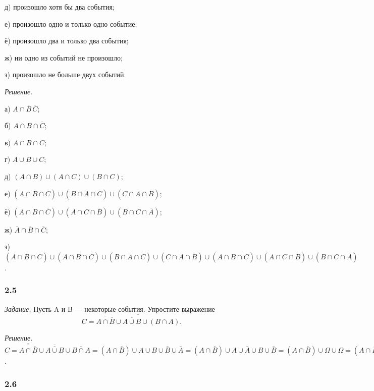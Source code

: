 \documentclass{book}
\begin{document}
д) произошло хотя бы два события;

е) произошло одно и только одно событие;

ё) произошло два и только два события;

ж) ни одно из событий не произошло;

з) произошло не больше двух событий.

\textit{Решение.}

а) $A\cap\overline{B}\,\overline{C}$;

б) $A\cap B\cap\overline{C}$;

в) $A\cap B\cap C$;

г) $A\cup B\cup C$;

д) $\left(A\cap B\right)\cup\left(A\cap C\right)\cup\left(B\cap C\right)$;

е) $\left(A\cap\overline{B}\cap\overline{C}\right)\cup\left(B\cap\overline{A}\cap\overline{C}\right)\cup\left(C\cap\overline{A}\cap\overline{B}\right)$;

ё) $\left(A\cap B\cap\overline{C}\right)\cup\left(A\cap C\cap\overline{B}\right)\cup\left(B\cap C\cap\overline{A}\right)$;

ж) $\overline{A}\cap\overline{B}\cap\overline{C}$;

з) $\left(\overline{A}\cap\overline{B}\cap\overline{C}\right)\cup\left(A\cap\overline{B}\cap\overline{C}\right)\cup\left(B\cap\overline{A}\cap\overline{C}\right)\cup\left(C\cap\overline{A}\cap\overline{B}\right)\cup\left(A\cap B\cap\overline{C}\right)\cup\left(A\cap C\cap\overline{B}\right)\cup\left(B\cap C\cap\overline{A}\right)$.

\subsubsection*{2.5}

\textit{Задание.} Пусть A и B --- некоторые события. Упростите выражение $$C=\overline{\overline{A\cap\overline{B}}\cup\overline{A\cup B}\cup\left(B\cap A\right)}.$$

\textit{Решение.} $C=\overline{\overline{A\cap\overline{B}}}\cup\overline{\overline{A\cup B}}\cup\overline{B\cap A}=\left(A\cap\overline{B}\right)\cup A\cup B\cup\overline{B}\cup\overline{A}=\left(A\cap\overline{B}\right)\cup A\cup\overline{A}\cup B\cup\overline{B}=\left(A\cap\overline{B}\right)\cup\Omega\cup\Omega=\left(A\cap\overline{B}\right)\cup\Omega=\Omega$.

\subsubsection*{2.6}
\end{document}
